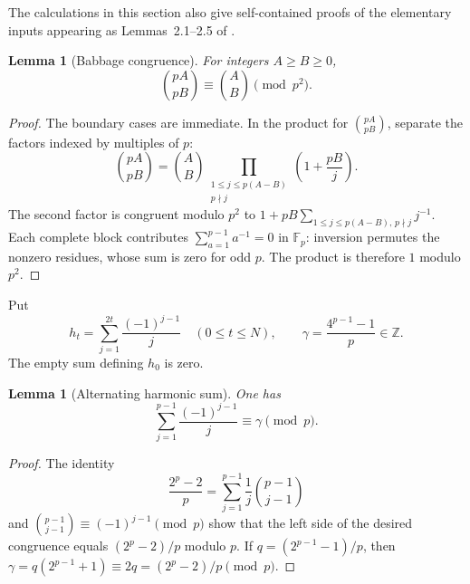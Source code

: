\documentclass[11pt,letterpaper]{article}
\newtheorem{lemma}[theorem]{Lemma}
\theoremstyle{definition}
\theoremstyle{remark}
\begin{document}
The calculations in this section also give self-contained proofs of the
elementary inputs appearing as Lemmas~2.1--2.5 of \cite{I:BD}.

\begin{lemma}[Babbage congruence]\label{I:lem:babbage}
For integers $A\ge B\ge0$,
\[
 \binom{pA}{pB}\equiv\binom AB\pmod{p^2}.
\]
\end{lemma}
\begin{proof}
The boundary cases are immediate.  In the product for
$\binom{pA}{pB}$, separate the factors indexed by multiples of $p$:
\[
 \binom{pA}{pB}
 =\binom AB
   \prod_{\substack{1\le j\le p(A-B)\\p\nmid j}}
                 \left(1+\frac{pB}{j}\right).
\]
The second factor is congruent modulo $p^2$ to
$1+pB\sum_{1\le j\le p(A-B),\,p\nmid j}j^{-1}$.
Each complete block contributes $\sum_{a=1}^{p-1}a^{-1}=0$ in
$\mathbb F_p$: inversion permutes the nonzero residues, whose sum is
zero for odd $p$.  The product is therefore $1$ modulo $p^2$.
\end{proof}

Put
\begin{equation}\label{I:eq:hgamma}
 h_t=\sum_{j=1}^{2t}\frac{(-1)^{j-1}}j\quad(0\le t\le N),
 \qquad \gamma=\frac{4^{p-1}-1}{p}\in\mathbb Z.
\end{equation}
The empty sum defining $h_0$ is zero.

\begin{lemma}[Alternating harmonic sum]\label{I:lem:eisenstein}
One has
\[
 \sum_{j=1}^{p-1}\frac{(-1)^{j-1}}j\equiv\gamma\pmod p.
\]
\end{lemma}
\begin{proof}
The identity
\[
 \frac{2^p-2}{p}
 =\sum_{j=1}^{p-1}\frac1j\binom{p-1}{j-1}
\]
and $\binom{p-1}{j-1}\equiv(-1)^{j-1}\pmod p$ show that the left
side of the desired congruence equals $(2^p-2)/p$ modulo $p$.
If $q=(2^{p-1}-1)/p$, then
$\gamma=q(2^{p-1}+1)\equiv2q=(2^p-2)/p\pmod p$.
\end{proof}
\end{document}
